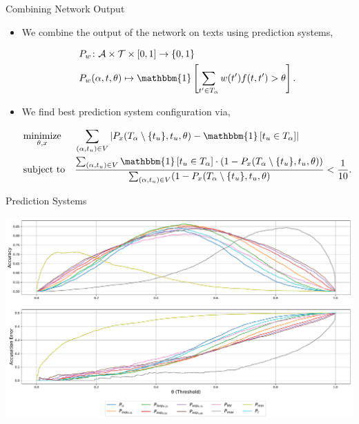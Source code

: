 \documentclass[10pt]{beamer}
\begin{document}
\begin{frame}[fragile]{Combining Network Output}
    \begin{itemize}
        \item We combine the output of the network on texts using prediction
            systems,

        \begin{align*}
            &P_w \colon \mathcal{A} \times \mathcal{T} \times [0, 1] \rightarrow
                \{0, 1\} \\
            &P_w(\alpha, t, \theta) \mapsto \mathbbm{1}\left[
                    \sum_{t' \in T_\alpha} w(t') f(t, t') > \theta
                \right].
        \end{align*}

        \item We find best prediction system configuration via,

        \begin{equation*}
            \begin{aligned}
                & \underset{\theta, x}{\text{minimize}}
                & & \sum_{(\alpha, t_u) \in V} \left|
                    P_x(T_\alpha \setminus \{t_u\}, t_u, \theta) -
                    \mathbbm{1}\left[t_u \in T_\alpha\right]
                \right| \\
                & \text{subject to}
                & & \frac{\sum_{(\alpha, t_u) \in V} \mathbbm{1}\left[t_u \in T_\alpha\right] \cdot
                    \left(1 - P_x(T_\alpha \setminus \{t_u\}, t_u, \theta)\right)}
        {\sum_{(\alpha, t_u) \in V} (1 - P_x(T_\alpha \setminus \{t_u\}, t_u, \theta)} <
                    \frac{1}{10}.
            \end{aligned}
        \end{equation*}
    \end{itemize}
\end{frame}

\begin{frame}[fragile]{Prediction Systems}
    \begin{center}
        \includegraphics[width=\textwidth]{../../report/pictures/experiments/conv_char_nn/prediction_system_50}
    \end{center}
\end{frame}
\end{document}
